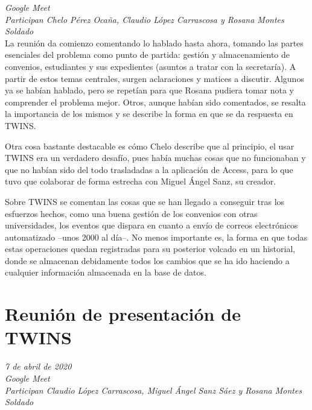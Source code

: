 \begin{appendices}
		\textit{Google Meet}\\
		
		\textit{Participan Chelo Pérez Ocaña, Claudio López Carrascosa y Rosana Montes Soldado}\\
		
		La reunión da comienzo comentando lo hablado hasta ahora, tomando las partes esenciales del problema como punto de partida: gestión y almacenamiento de convenios, estudiantes y sus expedientes (asuntos a tratar con la secretaría). A partir de estos temas centrales, surgen aclaraciones y matices a discutir. Algunos ya se habían hablado, pero se repetían para que Rosana pudiera tomar nota y comprender el problema mejor. Otros, aunque habían sido comentados, se resalta la importancia de los mismos y se describe la forma en que se da respuesta en TWINS.
		
		Otra cosa bastante destacable es cómo Chelo describe que al principio, el usar TWINS era un verdadero desafío, pues había muchas cosas que no funcionaban y que no habían sido del todo trasladadas a la aplicación de Access, para lo que tuvo que colaborar de forma estrecha con Miguel Ángel Sanz, su creador.
		
		Sobre TWINS se comentan las cosas que se han llegado a conseguir tras los esfuerzos hechos, como una buena gestión de los convenios con otras universidades, los eventos que dispara en cuanto a envío de correos electrónicos automatizado --unos 2000 al día--. No menos importante es, la forma en que todas estas operaciones quedan registradas para su posterior volcado en un historial, donde se almacenan debidamente todos los cambios que se ha ido haciendo a cualquier información almacenada en la base de datos.
		
		\section{Reunión de presentación de TWINS}
		
		\textit{7 de abril de 2020}\\
		
		\textit{Google Meet}\\
		
		\textit{Participan Claudio López Carrascosa, Miguel Ángel Sanz Sáez y Rosana Montes Soldado}
		
		
\end{appendices}